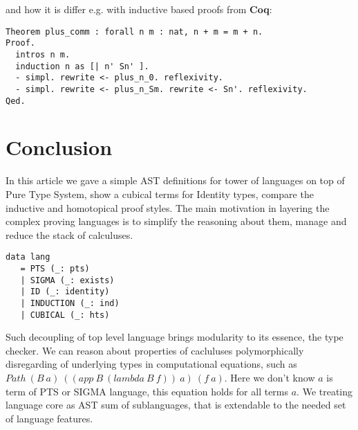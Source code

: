 \documentclass{aip-cp}
\begin{document}
and how it is differ e.g. with inductive based proofs from {\bf Coq}:

\begin{lstlisting}[mathescape=true]
Theorem plus_comm : forall n m : nat, n + m = m + n.
Proof.
  intros n m.
  induction n as [| n' Sn' ].
  - simpl. rewrite <- plus_n_0. reflexivity.
  - simpl. rewrite <- plus_n_Sm. rewrite <- Sn'. reflexivity.
Qed.
\end{lstlisting}

\section{Conclusion}
In this article we gave a simple AST definitions for tower of languages
on top of Pure Type System, show a cubical terms for Identity types, compare
the inductive and homotopical proof styles. The main motivation in
layering the complex proving languages is to simplify the reasoning about them,
manage and reduce the stack of calculuses.

\begin{lstlisting}[mathescape=true]
data lang
   = PTS (_: pts)
   | SIGMA (_: exists)
   | ID (_: identity)
   | INDUCTION (_: ind)
   | CUBICAL (_: hts)
\end{lstlisting}

Such decoupling of top level language brings modularity to its essence,
the type checker. We can reason about properties of cacluluses polymorphically
disregarding of underlying types in computational equations, such as
$Path\ (B\ a)\ ((app\ B\ (lambda\ B\ f))\ a)\ (f\ a)$. Here we don't know $a$ is
term of PTS or SIGMA language, this equation holds for all terms $a$.
We treating language core as AST sum of sublanguages, that is
extendable to the needed set of language features.



\newpage
\tableofcontents
\end{document}
